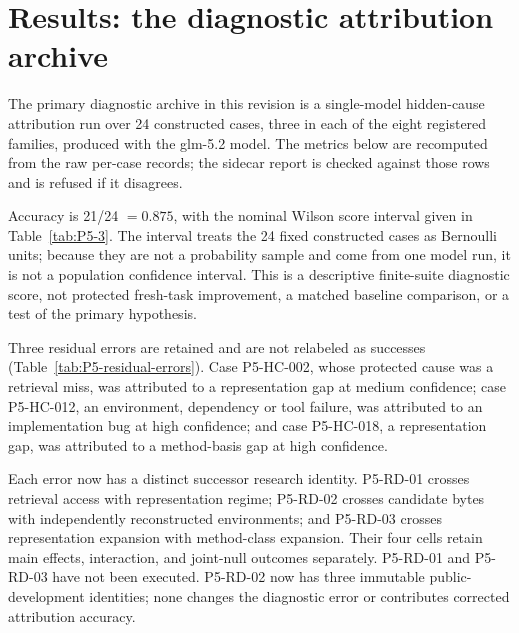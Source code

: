 \section{Results: the diagnostic attribution archive}
\label{sec:results}

The primary diagnostic archive in this revision is a single-model hidden-cause attribution run over 24 constructed cases, three in each of the eight registered families, produced with the glm-5.2 model. The metrics below are recomputed from the raw per-case records; the sidecar report is checked against those rows and is refused if it disagrees.

Accuracy is 21/24 $= 0.875$, with the nominal Wilson score interval given in
Table~\ref{tab:P5-3}. The interval treats the 24 fixed constructed cases as
Bernoulli units; because they are not a probability sample and come from one
model run, it is not a population confidence interval. This is a descriptive
finite-suite diagnostic score, not protected fresh-task improvement, a matched
baseline comparison, or a test of the primary hypothesis.

Three residual errors are retained and are not relabeled as successes (Table~\ref{tab:P5-residual-errors}). Case P5-HC-002, whose protected cause was a retrieval miss, was attributed to a representation gap at medium confidence; case P5-HC-012, an environment, dependency or tool failure, was attributed to an implementation bug at high confidence; and case P5-HC-018, a representation gap, was attributed to a method-basis gap at high confidence.

Each error now has a distinct successor research identity. P5-RD-01 crosses
retrieval access with representation regime; P5-RD-02 crosses candidate bytes
with independently reconstructed environments; and P5-RD-03 crosses
representation expansion with method-class expansion. Their four cells retain
main effects, interaction, and joint-null outcomes separately. P5-RD-01 and
P5-RD-03 have not been executed. P5-RD-02 now has three immutable public-development
identities; none changes the diagnostic error or contributes corrected
attribution accuracy.

